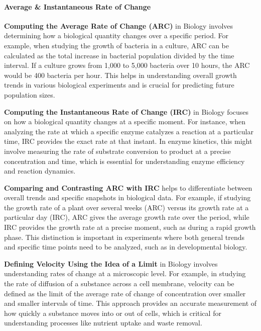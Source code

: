 \paragraph{Average \& Instantaneous Rate of Change}



\textbf{Computing the Average Rate of Change (ARC)} in Biology involves determining how a biological quantity changes over a specific period. For example, when studying the growth of bacteria in a culture, ARC can be calculated as the total increase in bacterial population divided by the time interval. If a culture grows from 1,000 to 5,000 bacteria over 10 hours, the ARC would be 400 bacteria per hour. This helps in understanding overall growth trends in various biological experiments and is crucial for predicting future population sizes.



\textbf{Computing the Instantaneous Rate of Change (IRC)} in Biology focuses on how a biological quantity changes at a specific moment. For instance, when analyzing the rate at which a specific enzyme catalyzes a reaction at a particular time, IRC provides the exact rate at that instant. In enzyme kinetics, this might involve measuring the rate of substrate conversion to product at a precise concentration and time, which is essential for understanding enzyme efficiency and reaction dynamics.



\textbf{Comparing and Contrasting ARC with IRC} helps to differentiate between overall trends and specific snapshots in biological data. For example, if studying the growth rate of a plant over several weeks (ARC) versus its growth rate at a particular day (IRC), ARC gives the average growth rate over the period, while IRC provides the growth rate at a precise moment, such as during a rapid growth phase. This distinction is important in experiments where both general trends and specific time points need to be analyzed, such as in developmental biology.



\textbf{Defining Velocity Using the Idea of a Limit} in Biology involves understanding rates of change at a microscopic level. For example, in studying the rate of diffusion of a substance across a cell membrane, velocity can be defined as the limit of the average rate of change of concentration over smaller and smaller intervals of time. This approach provides an accurate measurement of how quickly a substance moves into or out of cells, which is critical for understanding processes like nutrient uptake and waste removal.



